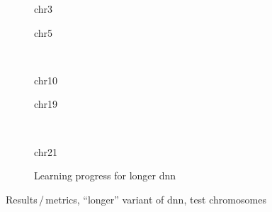 \begin{figure}[p] %
    \begin{subfigure}{0.45\textwidth}
        \scriptsize
        \caption{chr3}
    \end{subfigure} \hfill
    \begin{subfigure}{0.45\textwidth}
        \scriptsize
        \caption{chr5}
    \end{subfigure}\\[5mm]
    \begin{subfigure}{0.45\textwidth}
        \scriptsize
        \caption{chr10}
    \end{subfigure}\hfill
    \begin{subfigure}{0.45\textwidth}
        \scriptsize
        \caption{chr19}
    \end{subfigure}\\[3mm]
    \centering
    \begin{subfigure}{0.45\textwidth}
        \scriptsize
        \caption{chr21}
    \end{subfigure}\hfill
    \begin{subfigure}{0.45\textwidth}
        \caption{Learning progress for longer \acrshort{dnn}} \label{fig:results:longerDNN_lossEpochs}
    \end{subfigure}
    \caption{Results\,/\,metrics, ``longer'' variant of \acrshort{dnn},  test chromosomes}
    \label{fig:results:longerDNN_pearson}
\end{figure}

